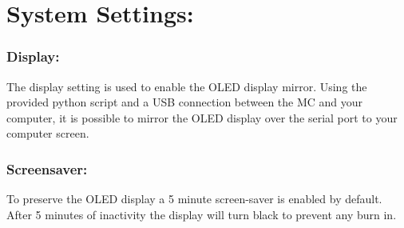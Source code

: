 \chapter{System Settings:}

\subsection{Display:}
The display setting is used to enable the OLED display mirror. Using the provided python script and a USB connection between the MC and your computer, it is possible to mirror the OLED display over the serial port to your computer screen.
\subsection{Screensaver:}
To preserve the OLED display a 5 minute screen-saver is enabled by default. After 5 minutes of inactivity the display will turn black to prevent any burn in.